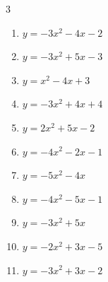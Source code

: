 \begin{multicols}{3}
\begin{enumerate}
  \item $\displaystyle y=-3x^{2}-4x-2$


  \item $\displaystyle y=-3x^{2}+5x-3$


  \item $\displaystyle y=x^{2}-4x+3$

        \phantom{$\displaystyle 頂点\left( 2 , -1 \right)$}

  \item $\displaystyle y=-3x^{2}+4x+4$


  \item $\displaystyle y=2x^{2}+5x-2$


\columnbreak %

  \item $\displaystyle y=-4x^{2}-2x-1$


  \item $\displaystyle y=-5x^{2}-4x$


  \item $\displaystyle y=-4x^{2}-5x-1$


  \item $\displaystyle y=-3x^{2}+5x$


  \item $\displaystyle y=-2x^{2}+3x-5$


\columnbreak %

  \item $\displaystyle y=-3x^{2}+3x-2$


\end{enumerate}
\end{multicols}
